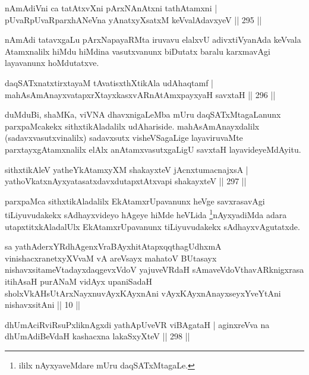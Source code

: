 
\begin{shl}
nAmAdiVni ca tatAtxvXni pArxNAnAtxni tathA\s \s tamxni |
pUvaRpUvaRparxhANeVna yAnatxyXsatxM keVvalAdavxyeV \hfill || 295 ||
\end{shl}

\begin{artha}
nAmAdi tatavxgaLu pArxNapayaRMta iruvavu elalxvU adivxtiVyanAda keVvala Atamxnalilx hiMdu hiMdina vasutxvanunx biDutatx baralu karxmavAgi layavanunx hoMdutatxve.
\end{artha}

\begin{shl}
daqSATxnatxtirxtayaM tAvatisxthXtikAla udAhaqtamf |
mahAsAmAnayxvatapxrXtayxkasxvARnAtAmxpayxyaH savxtaH \hfill || 296 ||
\end{shl}

\begin{artha}
duMduBi, shaMKa, viVNA dhavxnigaLeMba mUru daqSATxMtagaLanunx parxpaMcakekx sithxtikAladalilx udAhariside. mahAsAmAnayxdalilx (sadavxvasutxvinalilx) sadavxsutx visheVSagaLige layaviruvaMte parxtayxgAtamxnalilx elAlx anAtamxvasutxgaLigU savxtaH layavideyeMdAyitu.
\end{artha}

\begin{shl}
sithxtikAleV yatheYkAtamxyXM shakayxteV jAcnxtumacnajxsA |
yathoVkatxnAyxyatasatxdavxdutapxtAtxvapi shakayxteV \hfill || 297 ||
\end{shl}

\begin{artha}
parxpaMca sithxtikAladalilx EkAtamxrUpavanunx heVge savxrasavAgi tiLiyuvudakekx sAdhayxvideyo hAgeye hiMde heVLida \footnote{ililx nAyxyaveMdare mUru daqSATxMtagaLe.}nAyxyadiMda adara utapxtitxkAladalUlx EkAtamxrUpavanunx tiLiyuvudakekx sAdhayxvAgutatxde.
\end{artha}


\begin{kandikeshl}
sa yathAderxYRdhAgenxVraBAyxhitAtapxqqthagUdhxmA vinishacxranetxyXVvaM vA areV\s sayx mahatoV BUtasayx nishavxsitameVtadayxdaqgevxVdoV yajuveVRdaH sAmaveVdoV\s thavARknigxrasa itihAsaH purANaM vidAyx upaniSadaH sholxVkAH\break sUtArxNayxnuvAyxKAyxnAni vAyxKAyxnAnayxseyxYveYtAni nishavxsitAni || 10 ||
\end{kandikeshl}

\begin{shl}
dhUmAciRviRsuPxliknAgxdi yathApUveVR viBAgataH |
aginxreVva na dhUmAdiBeVdaH kashacxna lakaSxyXteV \hfill || 298 ||
\end{shl}


